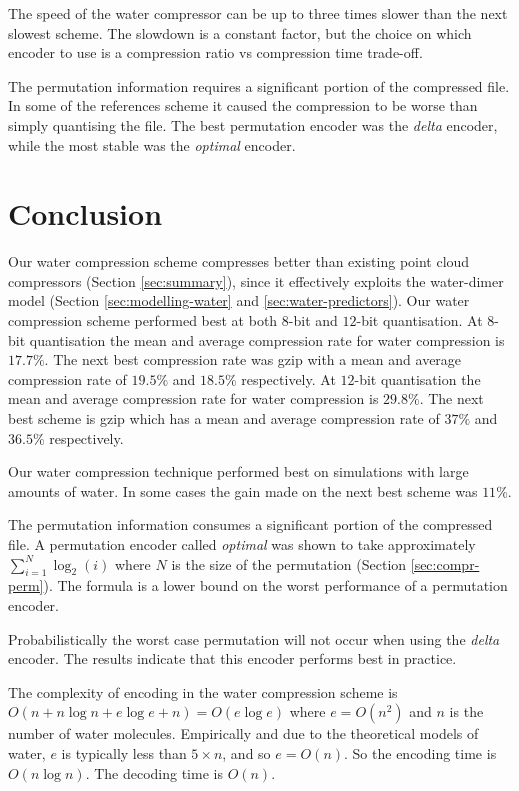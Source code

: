 \documentclass[a4paper]{report}
\begin{document}
The speed of the water compressor can be up to three times slower than the
next slowest scheme. The slowdown is a constant factor, but the choice on
which encoder to use is a compression ratio vs compression time trade-off.

The permutation information requires a significant portion of the compressed
file. In some of the references scheme it caused the compression to be worse
than simply quantising the file. The best permutation encoder was the
\emph{delta} encoder, while the most stable was the \emph{optimal} encoder.



\chapter{Conclusion}

Our water compression scheme compresses better than existing point cloud
compressors (Section \ref{sec:summary}), since it effectively exploits the
water-dimer model (Section \ref{sec:modelling-water} and
\ref{sec:water-predictors}). Our water compression scheme performed best at
both $8$-bit and $12$-bit quantisation. At $8$-bit quantisation the mean and
average compression rate for water compression is $17.7\%$. The next best
compression rate was gzip with a mean and average compression rate of $19.5\%$
and $18.5\%$ respectively. At $12$-bit quantisation the mean and average
compression rate for water compression is $29.8\%$. The next best scheme is
gzip which has a mean and average compression rate of $37\%$ and $36.5\%$
respectively.

Our water compression technique performed best on simulations with large
amounts of water. In some cases the gain made on the next best scheme was
$11\%$.

The permutation information consumes a significant portion of the compressed
file. A permutation encoder called \emph{optimal} was shown to take
approximately $\sum^{N}_{i=1} \log_2(i)$ where $N$ is the size of the
permutation (Section \ref{sec:compr-perm}). The formula is a lower bound on
the worst performance of a permutation encoder.

Probabilistically the worst case permutation will not occur when using the
\emph{delta} encoder. The results indicate that this encoder performs best in
practice.

The complexity of encoding in the water compression scheme is $O(n + n \log n
+ e \log e + n) = O(e \log e)$ where $e = O(n^2)$ and $n$ is the number of
water molecules. Empirically and due to the theoretical models of water, $e$
is typically less than $5 \times n$, and so $e = O(n)$. So the encoding time
is $O(n \log n)$. The decoding time is $O(n)$.
\end{document}
